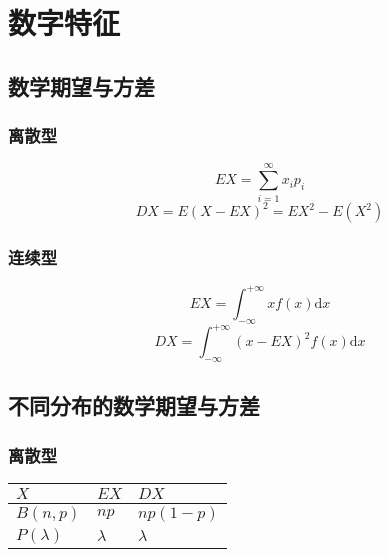 

\section{数字特征}

\subsection{数学期望与方差}

\subsubsection{离散型}


\begin{equation*}
  EX=\sum\limits_{i=1}^{\infty} x_{i} p_{i}
\end{equation*}
\begin{equation*}
  DX=E(X-EX)^{2}=EX^{2}-E(X^{2})
\end{equation*}

\subsubsection{连续型}
\begin{equation*}
  EX=\int_{-\infty}^{+\infty} x f(x) \mathrm{d} x
\end{equation*}
\begin{equation*}
  DX=\int_{-\infty}^{+\infty} (x-EX)^{2} f(x) \mathrm{d} x
\end{equation*}



\subsection{不同分布的数学期望与方差}

\subsubsection{ 离散型}


\begin{table}[H]
  \renewcommand\arraystretch{1.5}
  \begin{tabular}{|l|l|l|}
    \hline
    $X$&$EX$&$DX$\\
    \hline
    $B(n,p)$&$np$&$np(1-p)$\\
    \hline
    $P(\lambda)$&$\lambda$&$\lambda$\\
    \hline
  \end{tabular}
\end{table}

